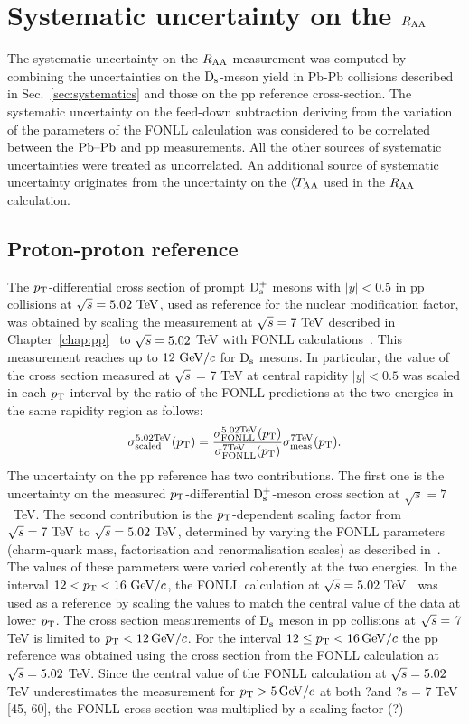 \section{Systematic uncertainty on the $R_{\rm AA}$}
\label{sec:SystRAA}
The systematic uncertainty on the $R_{\rm AA}$ measurement was computed by combining the uncertainties  
on the ${\rm D_s}$-meson yield in Pb-Pb collisions described in Sec.~\ref{sec:systematics} and those 
on the pp reference cross-section. The systematic 
uncertainty on the feed-down subtraction deriving from
the variation of the parameters of the FONLL calculation was considered to be
correlated between the $\mbox{Pb--Pb}$ and pp measurements. All the 
other sources of systematic uncertainties were treated as uncorrelated. 
An additional source of systematic uncertainty originates from the uncertainty
on the $\langle T_{\rm AA}$ used in the $R_{\rm AA}$ calculation.

\subsection{Proton-proton reference}
\label{sec:PPrefSyst}
The $p_{\rm T}$-differential cross section of prompt ${\rm D_s^+}$ mesons with 
$|y|<0.5$ in pp collisions at $\sqrt s=5.02~\mathrm{TeV}$, used as reference 
for the nuclear modification factor, was obtained by scaling the 
measurement at $\sqrt{s}=7~\mathrm{TeV}$ described in 
Chapter~\ref{chap:pp}~\cite{Acharya:2017jgo} to $\sqrt{s} = 5.02$ TeV 
with FONLL calculations~\cite{Cacciari:2012ny}. 
This measurement 
reaches up to $12~\mathrm{GeV}/c$ for ${\rm D_s}$ mesons.
In particular, the value of the cross section measured at $\sqrt{s}$ = 7 TeV 
at central rapidity $|y| < 0.5$ was scaled in each $p_{\rm T}$ interval by 
the ratio of the FONLL predictions at the two energies in the same rapidity region as follows:
\begin{equation}
\label{eq:scalingPP}
\sigma^{\rm 5.02 TeV}_{\rm scaled} (p_{\rm T}) = \frac{\sigma^{\rm 5.02 TeV}_{\rm FONLL} (p_{\rm T})}{\sigma^{\rm 7 TeV}_{\rm FONLL} (p_{\rm T})} \sigma^{\rm 7 TeV}_{\rm meas} (p_{\rm T}).
\end{equation}
The uncertainty on the pp reference 
has two contributions. The first one is the uncertainty on the measured 
$p_{\rm T}$-differential ${\rm D_s^+}$-meson cross section at $\sqrt s=7$~TeV.
The second contribution is the $p_{\rm T}$-dependent scaling factor 
from $\sqrt{s}=7~\mathrm{TeV}$ to $\sqrt{s}=5.02~\mathrm{TeV}$, determined by varying
the FONLL parameters (charm-quark mass, factorisation and renormalisation scales) 
as described in~\cite{Averbeck:2011ga}. The values of these parameters were 
varied coherently at the two energies.
In the interval $12<p_{\rm T}<16~\mathrm{GeV}/c$, the FONLL calculation at 
$\sqrt s=5.02~\mathrm{TeV}$~\cite{Cacciari:2012ny} was used as a reference 
by scaling the values to match the central value of the data at lower $p_{\rm T}$. 
\iffalse
The cross section measurements of ${\rm D_s}$ meson in pp collisions at $\sqrt{s} = $ 7 TeV 
is limited to $p_{\rm T} < 12 \, \mathrm{GeV}/c$. For the interval $12 \leq p_{\rm T} < 16 \, \mathrm{GeV}/c$ 
the pp reference was obtained using the cross section from the FONLL calculation at $\sqrt{s} = 5.02$ TeV. 
Since the central value of the FONLL calculation at $\sqrt{s} = 5.02$ TeV underestimates the measurement 
for $p_{\rm T} > 5 \, \mathrm{GeV}/c$ at both ?and ?s = 7 TeV [45, 60], the FONLL cross section was multiplied by a scaling factor (?) 

